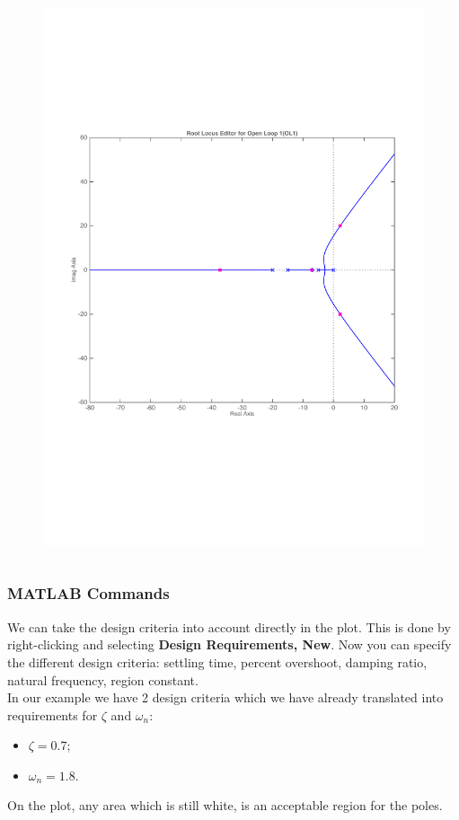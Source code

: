 \begin{frame}
\begin{exampleblock}{}
\begin{columns}
\begin{column}{0.5\textwidth}
\begin{figure}
				\includegraphics[width=0.9\linewidth]{matlab_ex5}
			\end{figure}
		\end{column}
	\end{columns}
	\end{exampleblock}
\end{frame}

\begin{frame}
\frametitle{MATLAB Commands}
	\begin{exampleblock}{}
		We can take the design criteria into account directly in the plot. This is done by right-clicking and selecting \textbf{Design Requirements, New}. Now you can specify the different design criteria: settling time, percent overshoot, damping ratio, natural frequency, region constant.\\
		\vspace{1em}
		In our example we have 2 design criteria which we have already translated into requirements for $\zeta$ and $\omega_n$: 
		\begin{itemize}
			\item $\zeta = 0.7$;
			\item $\omega_n = 1.8$.
		\end{itemize}
		\vspace{1em}
		On the plot, any area which is still white, is an acceptable region for the poles.
	\end{exampleblock}
\end{frame}

